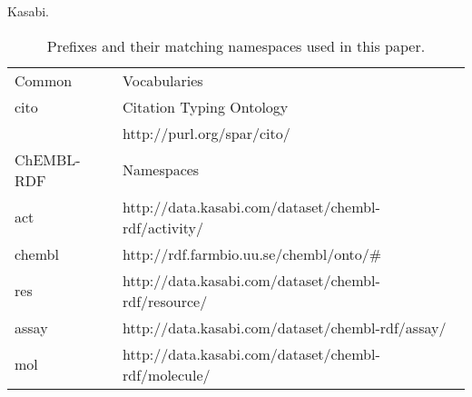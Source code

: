 \documentclass[sw]{iosart2c}
\begin{document}
Kasabi.


\begin{table*}
\caption{Prefixes and their matching namespaces used in this paper.} \label{namespaces}
\begin{tabular}{ll}
\hline
Common & Vocabularies \\
cito & Citation Typing Ontology~\cite{ont:cito} \\
     & http://purl.org/spar/cito/ \\

\hline
ChEMBL-RDF & Namespaces\\
act    & http://data.kasabi.com/dataset/chembl-rdf/activity/ \\
chembl & http://rdf.farmbio.uu.se/chembl/onto/\# \\
res    & http://data.kasabi.com/dataset/chembl-rdf/resource/ \\
assay  & http://data.kasabi.com/dataset/chembl-rdf/assay/ \\
mol    & http://data.kasabi.com/dataset/chembl-rdf/molecule/ \\
\hline
\end{tabular}
\end{table*}



%
%
%

\end{document}
